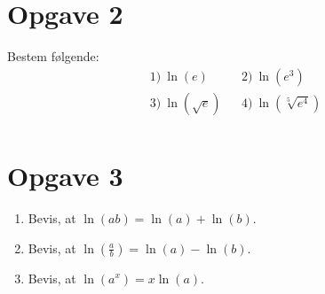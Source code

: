 \section*{Opgave 2}
Bestem følgende:
\begin{align*}
&1) \  \ln(e)  &&2) \  \ln(e^3)    \\
&3) \  \ln(\sqrt{e})  &&4) \ \ln(\sqrt[5]{e^4})      \\
\end{align*}


\section*{Opgave 3}
\begin{enumerate}[label=\roman*)]
\item Bevis, at  $\ln(ab) = \ln(a)+\ln(b).$
\item Bevis, at  $\ln(\frac{a}{b}) = \ln(a)-\ln(b)$.
\item Bevis, at  $\ln(a^x) = x\ln(a)$.
\end{enumerate}

